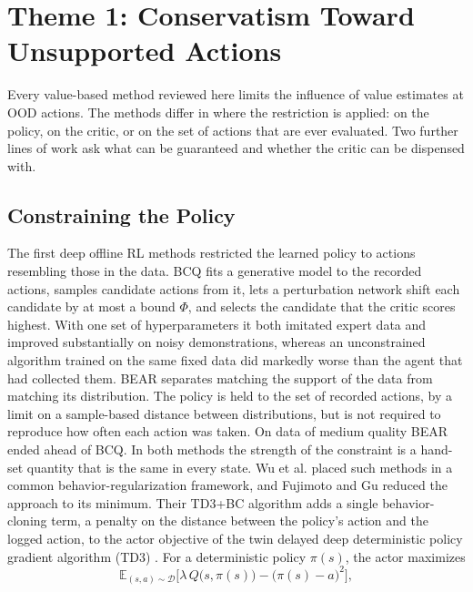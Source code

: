 \documentclass[conference]{IEEEtran}
\begin{document}
\section{Theme 1: Conservatism Toward Unsupported Actions}
\label{sec:theme1}
Every value-based method reviewed here limits the influence of value estimates at OOD actions. The methods differ in where the restriction is applied: on the policy, on the critic, or on the set of actions that are ever evaluated. Two further lines of work ask what can be guaranteed and whether the critic can be dispensed with.

\subsection{Constraining the Policy}
The first deep offline RL methods restricted the learned policy to actions resembling those in the data. BCQ \cite{fujimoto2019bcq} fits a generative model to the recorded actions, samples candidate actions from it, lets a perturbation network shift each candidate by at most a bound $\Phi$, and selects the candidate that the critic scores highest. With one set of hyperparameters it both imitated expert data and improved substantially on noisy demonstrations, whereas an unconstrained algorithm trained on the same fixed data did markedly worse than the agent that had collected them. BEAR \cite{kumar2019bear} separates matching the support of the data from matching its distribution. The policy is held to the set of recorded actions, by a limit on a sample-based distance between distributions, but is not required to reproduce how often each action was taken. On data of medium quality BEAR ended ahead of BCQ. In both methods the strength of the constraint is a hand-set quantity that is the same in every state. Wu et al. \cite{wu2019brac} placed such methods in a common behavior-regularization framework, and Fujimoto and Gu \cite{fujimoto2021td3bc} reduced the approach to its minimum. Their TD3+BC algorithm adds a single behavior-cloning term, a penalty on the distance between the policy's action and the logged action, to the actor objective of the twin delayed deep deterministic policy gradient algorithm (TD3) \cite{fujimoto2018td3}. For a deterministic policy $\pi(s)$, the actor maximizes
\begin{equation}
\mathbb{E}_{(s,a) \sim \mathcal{D}}\Big[\lambda\, Q\big(s,\pi(s)\big) - \big(\pi(s) - a\big)^{2}\Big],
\label{eq:td3bc}
\end{equation}
\end{document}
